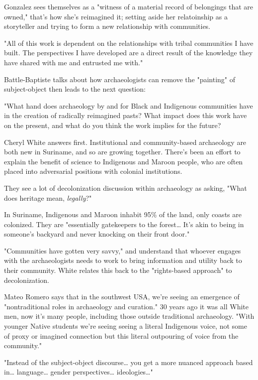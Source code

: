 \documentclass[11pt]{article}
\begin{document}
Gonzalez sees themselves as a "witness of a material record of belongings that are owned," that's how she's reimagined it; setting aside her relatoinship as a storyteller and trying to form a new relationship with communities.

"All of this work is dependent on the relationships with tribal communities I have built. The perspectives I have developed are a direct result of the knowledge they have shared with me and entrusted me with."

Battle-Baptiste talks about how archaeologists can remove the "painting" of subject-object then leads to the next question:

"What hand does archaeology by and for Black and Indigenous communities have in the creation of radically reimagined pasts? What impact does this work have on the present, and what do you think the work implies for the future?

Cheryl White answers first. Institutional and community-based archaeology are both new in Suriname, and so are growing together. There's been an effort to explain the benefit of science to Indigenous and Maroon people, who are often placed into adversarial positions with colonial institutions.

They see a lot of decolonization discussion within archaeology as asking, "What does heritage mean, \emph{legally}?"

In Suriname, Indigenous and Maroon inhabit 95\% of the land, only coasts are colonized. They are "essentially gatekeepers to the forest… It's akin to being in someone's backyard and never knocking on their front door."

"Communities have gotten very savvy," and understand that whoever engages with the archaeologists needs to work to bring information and utility back to their community. White relates this back to the "rights-based approach" to decolonization.

Mateo Romero says that in the southwest USA, we're seeing an emergence of "nontraditional roles in archaeology and curation." 30 years ago it was all White men, now it's many people, including those outside traditional archaeology. "With younger Native students we're seeing seeing a literal Indigenous voice, not some of proxy or imagined connection but this literal outpouring of voice from the community."

"Instead of the subject-object discourse… you get a more nuanced approach based in… language… gender perspectives… ideologies…"
\end{document}
